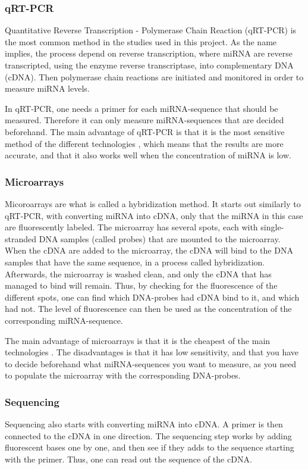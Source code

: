 \subsubsection{qRT-PCR}
Quantitative Reverse Transcription - Polymerase Chain Reaction (qRT-PCR) is the most common method in the studies used in this project. As the name implies, the process depend on reverse transcription, where miRNA are reverse transcripted, using the enzyme reverse transcriptase, into complementary DNA (cDNA). Then polymerase chain reactions are initiated and monitored in order to measure miRNA levels.

In qRT-PCR, one needs a primer for each miRNA-sequence that should be measured. Therefore it can only measure miRNA-sequences that are decided beforehand. The main advantage of qRT-PCR is that it is the most sensitive method of the different technologies \citep{mirnatech}, which means that the results are more accurate, and that it also works well when the concentration of miRNA is low. 

\subsubsection{Microarrays}
Micoroarrays are what is called a hybridization method. It starts out similarly to qRT-PCR, with converting miRNA into cDNA, only that the miRNA in this case are fluorescently labeled. The microarray has several spots, each with single-stranded DNA samples (called probes) that are mounted to the microarray. When the cDNA are added to the microarray, the cDNA will bind to the DNA samples that have the same sequence, in a process called hybridization. Afterwards, the microarray is washed clean, and only the cDNA that has managed to bind will remain. Thus, by checking for the fluorescence of the different spots, one can find which DNA-probes had cDNA bind to it, and which had not. The level of fluorescence can then be used as the concentration of the corresponding miRNA-sequence.

The main advantage of microarrays is that it is the cheapest of the main technologies \citep{mirnatech}. The disadvantages is that it has low sensitivity, and that you have to decide beforehand what miRNA-sequences you want to measure, as you need to populate the microarray with the corresponding DNA-probes.  

\subsubsection{Sequencing}
Sequencing also starts with converting miRNA into cDNA. A primer is then connected to the cDNA in one direction. The sequencing step works by adding fluorescent bases one by one, and then see if they adds to the sequence starting with the primer. Thus, one can read out the sequence of the cDNA.

